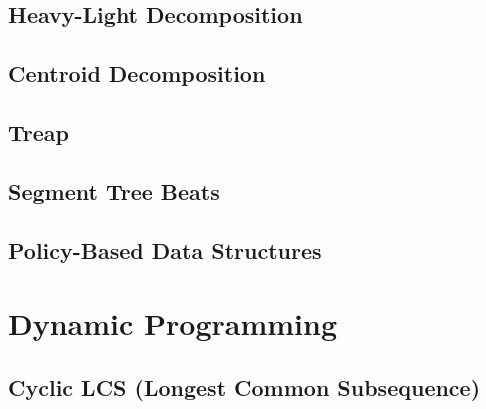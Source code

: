 \subsection{Heavy-Light Decomposition}


\subsection{Centroid Decomposition}


\subsection{Treap}

% 

\subsection{Segment Tree Beats}


\subsection{Policy-Based Data Structures}



\section{Dynamic Programming}

% 

\subsection{Cyclic LCS (Longest Common Subsequence)}


